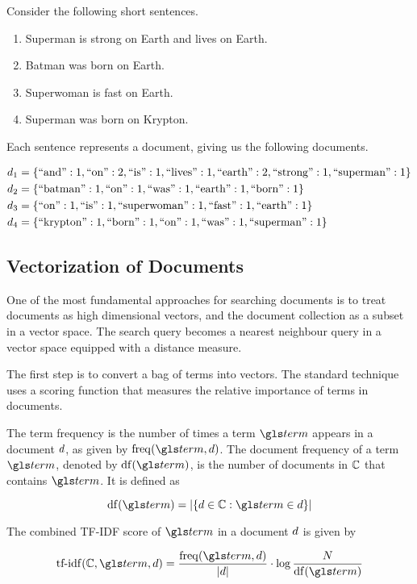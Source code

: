 	\begin{ex}
	\label{ex:superhero-documents}
		Consider the following short sentences.
		
		\begin{enumerate}
			\item Superman is strong on Earth and lives on Earth.
			\item Batman was born on Earth.
			\item Superwoman is fast on Earth.
			\item Superman was born on Krypton.
		\end{enumerate}
		
		Each sentence represents a document, giving us the following documents.
		
		\begin{align}
			d_1 &= \{\text{``and''}: 1, \text{``on''}: 2, \text{``is''}: 1, \text{``lives''}: 1, \text{``earth''}: 2, \text{``strong''}: 1, \text{``superman''}: 1\} \\
			d_2 &= \{\text{``batman''}: 1, \text{``on''}: 1, \text{``was''}: 1, \text{``earth''}: 1, \text{``born''}: 1\} \\
			d_3 &= \{\text{``on''}: 1, \text{``is''}: 1, \text{``superwoman''}: 1, \text{``fast''}: 1, \text{``earth''}: 1\} \\
			d_4 &= \{\text{``krypton''}: 1, \text{``born''}: 1, \text{``on''}: 1, \text{``was''}: 1, \text{``superman''}: 1\} \\
		\end{align}
	\end{ex}
	
	\subsection{Vectorization of Documents}
	\label{sec:vectorization-of-documents}
		One of the most fundamental approaches for searching documents is to treat documents as high dimensional vectors, and the document collection as a subset in a vector space.	 The search query becomes a nearest neighbour query in a vector space equipped with a distance measure.
		
		The first step is to convert a bag of terms into vectors.	 The standard technique \cite{ir-08} uses a scoring function that measures the relative importance of terms in documents.
		
		\begin{defn} 
			The term frequency is the number of times a term \(\term\) appears in a document \(d\), as given by \(\freq(\term, \doc)\).	The document frequency of a term \(\term\), denoted by \(\df(\term)\), is the number of documents in \(\mathbb{C}\) that contains \(\term\).	 It is defined as
			
			\[
				\df(\term) = \abs{\{\doc \in \dc: \term \in \doc\}}
			\]
			
			The combined TF-IDF score of \(\term\) in a document \(d\) is given by
			
			\[
				\tfidf(\dc, \term, \doc) = \frac{\freq(\term, \doc)}{\abs{\doc}} \cdot \log{\frac{N}{\df(\term)}}
			\]
		\end{defn}
		
